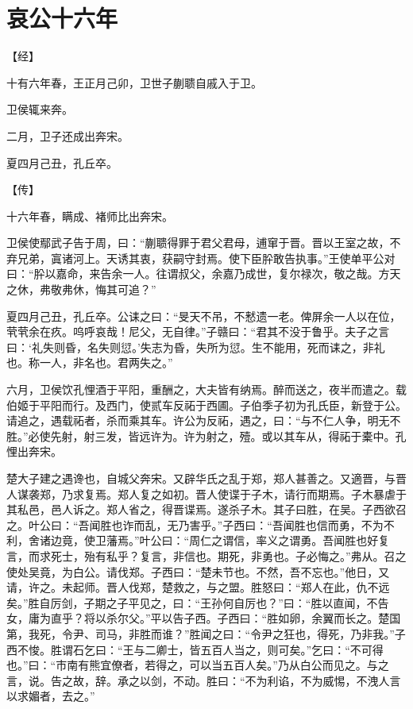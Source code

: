 \documentclass[a4paper,12pt,UTF8,twoside]{ctexbook}
\begin{document}
\chapter{哀公十六年}



【经】

十有六年春，王正月己卯，卫世子蒯聩自戚入于卫。

卫侯辄来奔。

二月，卫子还成出奔宋。

夏四月己丑，孔丘卒。

【传】

十六年春，瞒成、褚师比出奔宋。

卫侯使鄢武子告于周，曰：“蒯聩得罪于君父君母，逋窜于晋。晋以王室之故，不弃兄弟，寘诸河上。天诱其衷，获嗣守封焉。使下臣肸敢告执事。”王使单平公对曰：“肸以嘉命，来告余一人。往谓叔父，余嘉乃成世，复尔禄次，敬之哉。方天之休，弗敬弗休，悔其可追？”

夏四月己丑，孔丘卒。公诔之曰：“旻天不吊，不慭遗一老。俾屏余一人以在位，茕茕余在疚。呜呼哀哉！尼父，无自律。”子赣曰：“君其不没于鲁乎。夫子之言曰：‘礼失则昏，名失则愆。’失志为昏，失所为愆。生不能用，死而诔之，非礼也。称一人，非名也。君两失之。”

六月，卫侯饮孔悝酒于平阳，重酬之，大夫皆有纳焉。醉而送之，夜半而遣之。载伯姬于平阳而行。及西门，使贰车反祏于西圃。子伯季子初为孔氏臣，新登于公。请追之，遇载祏者，杀而乘其车。许公为反祏，遇之，曰：“与不仁人争，明无不胜。”必使先射，射三发，皆远许为。许为射之，殪。或以其车从，得祏于橐中。孔悝出奔宋。

楚大子建之遇谗也，自城父奔宋。又辟华氏之乱于郑，郑人甚善之。又適晋，与晋人谋袭郑，乃求复焉。郑人复之如初。晋人使谍于子木，请行而期焉。子木暴虐于其私邑，邑人诉之。郑人省之，得晋谍焉。遂杀子木。其子曰胜，在吴。子西欲召之。叶公曰：“吾闻胜也诈而乱，无乃害乎。”子西曰：“吾闻胜也信而勇，不为不利，舍诸边竟，使卫藩焉。”叶公曰：“周仁之谓信，率义之谓勇。吾闻胜也好复言，而求死士，殆有私乎？复言，非信也。期死，非勇也。子必悔之。”弗从。召之使处吴竟，为白公。请伐郑。子西曰：“楚未节也。不然，吾不忘也。”他日，又请，许之。未起师。晋人伐郑，楚救之，与之盟。胜怒曰：“郑人在此，仇不远矣。”胜自厉剑，子期之子平见之，曰：“王孙何自厉也？”曰：“胜以直闻，不告女，庸为直乎？将以杀尔父。”平以告子西。子西曰：“胜如卵，余翼而长之。楚国第，我死，令尹、司马，非胜而谁？”胜闻之曰：“令尹之狂也，得死，乃非我。”子西不悛。胜谓石乞曰：“王与二卿士，皆五百人当之，则可矣。”乞曰：“不可得也。”曰：“市南有熊宜僚者，若得之，可以当五百人矣。”乃从白公而见之。与之言，说。告之故，辞。承之以剑，不动。胜曰：“不为利谄，不为威惕，不洩人言以求媚者，去之。”
\end{document}
